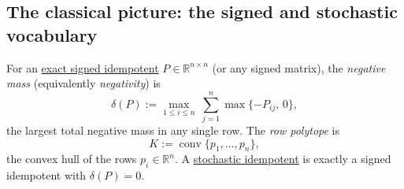 
\subsection*{The classical picture: the signed and stochastic vocabulary}

\hypertarget{def:negative-mass}{}%
\begin{definition}\label{def:negative-mass}
For an \hyperref[def:signed-idempotent]{exact signed idempotent} $P\in\mathbb R^{n\times n}$ (or any
signed matrix), the \emph{negative mass} (equivalently \emph{negativity}) is
\[\delta(P):=\max_{1\le i\le n}\ \sum_{j=1}^{n}\max\{-P_{ij},\,0\},\]
the largest total negative mass in any single row. The \emph{row polytope} is
\[K:=\operatorname{conv}\{p_1,\dots,p_n\},\]
the convex hull of the rows $p_i\in\mathbb R^n$. A \hyperref[def:stochastic]{stochastic idempotent} is exactly a
signed idempotent with $\delta(P)=0$.
\end{definition}
